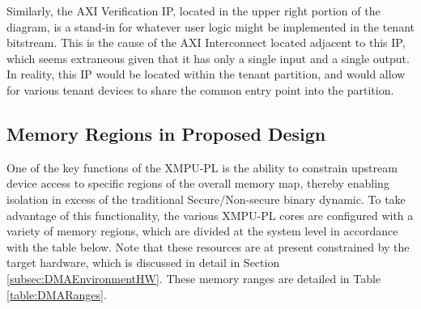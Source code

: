 Similarly, the AXI Verification IP, located in the upper right portion of the diagram, is a stand-in for whatever user logic might be implemented in the tenant bitstream. This is the cause of the AXI Interconnect located adjacent to this IP, which seems extraneous given that it has only a single input and a single output. In reality, this IP would be located within the tenant partition, and would allow for various tenant devices to share the common entry point into the partition.

\subsection{Memory Regions in Proposed Design}\label{subsec:DMAMemRegions}
One of the key functions of the XMPU-PL is the ability to constrain upstream device access to specific regions of the overall memory map, thereby enabling isolation in excess of the traditional Secure/Non-secure binary dynamic. To take advantage of this functionality, the various XMPU-PL cores are configured with a variety of memory regions, which are divided at the system level in accordance with the table below. Note that these resources are at present constrained by the target hardware, which is discussed in detail in Section \ref{subsec:DMAEnvironmentHW}. These memory ranges are detailed in Table \ref{table:DMARanges}.

